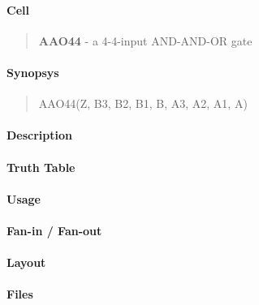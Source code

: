 \label{AAO44}
\paragraph{Cell}
\begin{quote}
    \textbf{AAO44} - a 4-4-input AND-AND-OR gate
\end{quote}

\paragraph{Synopsys}
\begin{quote}
    AAO44(Z, B3, B2, B1, B, A3, A2, A1, A)
\end{quote}

\paragraph{Description}

%

\paragraph{Truth Table}
%

\paragraph{Usage}

\paragraph{Fan-in / Fan-out}

\paragraph{Layout}

\paragraph{Files}

